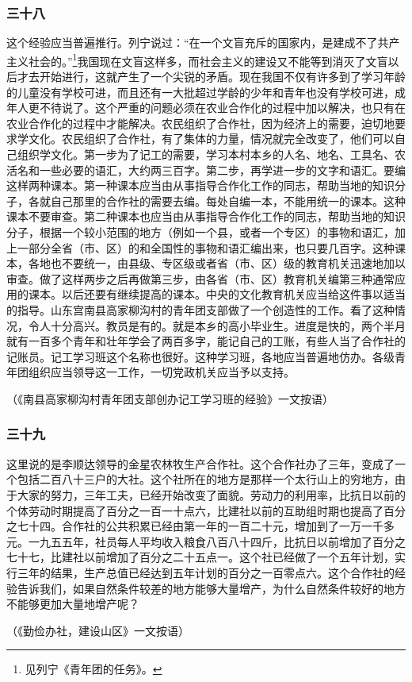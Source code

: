 \documentclass[cn,11pt,chinese]{elegantbook}
\def\myformat#1{\hfil\hfil #1}
\begin{document}
\subsubsection*{\myformat{三十八}}
这个经验应当普遍推行。列宁说过：“在一个文盲充斥的国家内，是建成不了共产主义社会的。”\footnote[2]{见列宁《青年团的任务》。}我国现在文盲这样多，而社会主义的建设又不能等到消灭了文盲以后才去开始进行，这就产生了一个尖锐的矛盾。现在我国不仅有许多到了学习年龄的儿童没有学校可进，而且还有一大批超过学龄的少年和青年也没有学校可进，成年人更不待说了。这个严重的问题必须在农业合作化的过程中加以解决，也只有在农业合作化的过程中才能解决。农民组织了合作社，因为经济上的需要，迫切地要求学文化。农民组织了合作社，有了集体的力量，情况就完全改变了，他们可以自己组织学文化。第一步为了记工的需要，学习本村本乡的人名、地名、工具名、农活名和一些必要的语汇，大约两三百字。第二步，再学进一步的文字和语汇。要编这样两种课本。第一种课本应当由从事指导合作化工作的同志，帮助当地的知识分子，各就自己那里的合作社的需要去编。每处自编一本，不能用统一的课本。这种课本不要审查。第二种课本也应当由从事指导合作化工作的同志，帮助当地的知识分子，根据一个较小范围的地方（例如一个县，或者一个专区）的事物和语汇，加上一部分全省（市、区）的和全国性的事物和语汇编出来，也只要几百字。这种课本，各地也不要统一，由县级、专区级或者省（市、区）级的教育机关迅速地加以审查。做了这样两步之后再做第三步，由各省（市、区）教育机关编第三种通常应用的课本。以后还要有继续提高的课本。中央的文化教育机关应当给这件事以适当的指导。山东宫南县高家柳沟村的青年团支部做了一个创造性的工作。看了这种情况，令人十分高兴。教员是有的。就是本乡的高小毕业生。进度是快的，两个半月就有一百多个青年和壮年学会了两百多字，能记自己的工账，有些人当了合作社的记账员。记工学习班这个名称也很好。这种学习班，各地应当普遍地仿办。各级青年团组织应当领导这一工作，一切党政机关应当予以支持。\\
\begin{flushright}（《南县高家柳沟村青年团支部创办记工学习班的经验》一文按语）\end{flushright}
\subsubsection*{\myformat{三十九}}
这里说的是李顺达领导的金星农林牧生产合作社。这个合作社办了三年，变成了一个包括二百八十三户的大社。这个社所在的地方是那样一个太行山上的穷地方，由于大家的努力，三年工夫，已经开始改变了面貌。劳动力的利用率，比抗日以前的个体劳动时期提高了百分之一百一十点六，比建社以前的互助组时期也提高了百分之七十四。合作社的公共积累已经由第一年的一百二十元，增加到了一万一千多元。一九五五年，社员每人平均收入粮食八百八十四斤，比抗日以前增加了百分之七十七，比建社以前增加了百分之二十五点一。这个社已经做了一个五年计划，实行三年的结果，生产总值已经达到五年计划的百分之一百零点六。这个合作社的经验告诉我们，如果自然条件较差的地方能够大量增产，为什么自然条件较好的地方不能够更加大量地增产呢？\\
\begin{flushright}（《勤俭办社，建设山区》一文按语）\end{flushright}
\end{document}
